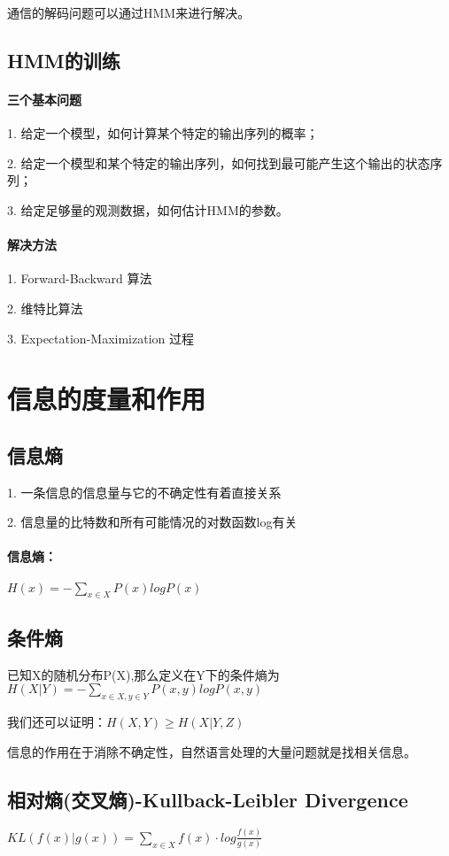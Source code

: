 \documentclass[UTF8]{article}
\begin{document}
	通信的解码问题可以通过HMM来进行解决。

	\subsection{HMM的训练}
	\paragraph{三个基本问题}
	1. 给定一个模型，如何计算某个特定的输出序列的概率；

	2. 给定一个模型和某个特定的输出序列，如何找到最可能产生这个输出的状态序列；

	3. 给定足够量的观测数据，如何估计HMM的参数。

	\paragraph{解决方法}
	1. Forward-Backward 算法

	2. 维特比算法

	3. Expectation-Maximization 过程
	\section{信息的度量和作用}
	\subsection{信息熵}
	1. 一条信息的信息量与它的不确定性有着直接关系

	2. 信息量的比特数和所有可能情况的对数函数log有关

	\paragraph{信息熵：} $H(x)=-\sum_{x\in X}P(x)logP(x)$

	\subsection{条件熵}
	已知X的随机分布P(X),那么定义在Y下的条件熵为$H(X|Y)=-\sum_{x\in X, y\in Y}P(x,y)logP(x,y)$

	我们还可以证明：$H(X,Y)\ge H(X|Y,Z)$

	信息的作用在于消除不确定性，自然语言处理的大量问题就是找相关信息。

	\subsection{相对熵(交叉熵)-Kullback-Leibler Divergence}
	$KL(f(x)|g(x))=\sum_{x\in X}f(x)\cdot log\frac{f(x)}{g(x)}$
\end{document}
